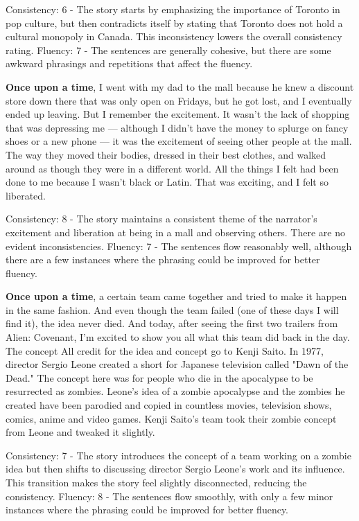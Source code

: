 \documentclass{article}
\begin{document}
Consistency: 6 - The story starts by emphasizing the importance of Toronto in pop culture, but then contradicts itself by stating that Toronto does not hold a cultural monopoly in Canada. This inconsistency lowers the overall consistency rating.
Fluency: 7 - The sentences are generally cohesive, but there are some awkward phrasings and repetitions that affect the fluency.

\textbf{Once upon a time}, I went with my dad to the mall because he knew a discount store down there that was only open on Fridays, but he got lost, and I eventually ended up leaving. But I remember the excitement. It wasn't the lack of shopping that was depressing me — although I didn't have the money to splurge on fancy shoes or a new phone — it was the excitement of seeing other people at the mall. The way they moved their bodies, dressed in their best clothes, and walked around as though they were in a different world. All the things I felt had been done to me because I wasn't black or Latin. That was exciting, and I felt so liberated.

Consistency: 8 - The story maintains a consistent theme of the narrator's excitement and liberation at being in a mall and observing others. There are no evident inconsistencies.
Fluency: 7 - The sentences flow reasonably well, although there are a few instances where the phrasing could be improved for better fluency.

\textbf{Once upon a time}, a certain team came together and tried to make it happen in the same fashion. And even though the team failed (one of these days I will find it), the idea never died.  And today, after seeing the first two trailers from Alien: Covenant, I'm excited to show you all what this team did back in the day.  The concept  All credit for the idea and concept go to Kenji Saito.  In 1977, director Sergio Leone created a short for Japanese television called "Dawn of the Dead." The concept here was for people who die in the apocalypse to be resurrected as zombies. Leone's idea of a zombie apocalypse and the zombies he created have been parodied and copied in countless movies, television shows, comics, anime and video games.  Kenji Saito's team took their zombie concept from Leone and tweaked it slightly.

Consistency: 7 - The story introduces the concept of a team working on a zombie idea but then shifts to discussing director Sergio Leone's work and its influence. This transition makes the story feel slightly disconnected, reducing the consistency.
Fluency: 8 - The sentences flow smoothly, with only a few minor instances where the phrasing could be improved for better fluency.
\end{document}
